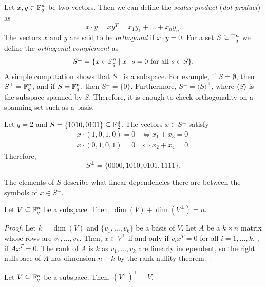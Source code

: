 \documentclass[../main.tex]{subfiles}
\begin{document}
Let $x, y \in \mathbb{F}_q^n$ be two vectors. Then we can define the \emph{scalar product} (\emph{dot product}) as
\begin{equation*}
    x \cdot y = xy^T = x_1y_1 + \dots + x_ny_n.
\end{equation*}
The vectors $x$ and $y$ are said to be \emph{orthogonal} if $x \cdot y = 0$. For a set $S \subseteq \mathbb{F}_q^n$ we define the \emph{orthogonal complement} as
\begin{equation*}
    S^\perp = \{x \in \mathbb{F}_q^n \mid x \cdot s = 0 \text{ for all $s \in S$}\}.
\end{equation*}
A simple computation shows that $S^\perp$ is a subspace. For example, if $S = \emptyset$, then $S^\perp = \mathbb{F}_q^n$, and if $S = \mathbb{F}_q^n$, then $S^\perp = \{0\}$. Furthermore, $S^\perp = \langle S \rangle^\perp$, where $\langle S \rangle$ is the subspace spanned by $S$. Therefore, it is enough to check orthogonality on a spanning set such as a basis.

\begin{example}
Let $q = 2$ and $S = \{ 1010, 0101 \} \subseteq \mathbb{F}_2^4$. The vectors $x \in S^\perp$ satisfy
\begin{align*}
    x \cdot (1, 0, 1, 0) = 0 &\iff x_1 + x_3 = 0 \\
    x \cdot (0, 1, 0, 1) = 0 &\iff x_2 + x_4 = 0.
\end{align*}
Therefore,
\begin{equation*}
    S^\perp = \{0000, 1010, 0101, 1111\}.
\end{equation*}
\end{example}

The elements of $S$ describe what linear dependencies there are between the symbols of $x \in S^\perp$.

\begin{theorem}\label{thm:dual_space_dimension}
Let $V \subseteq \mathbb{F}_q^n$ be a subspace. Then, $\dim(V) + \dim(V^\perp) = n$.
\end{theorem}

\begin{proof}
Let $k = \dim(V)$ and $\{v_1, \dots, v_k\}$ be a basis of $V$. Let $A$ be a $k \times n$ matrix whose rows are $v_1, \dots, v_k$. Then, $x \in V^\perp$ if and only if $v_i x^T = 0$ for all $i = 1, \dots, k$, \ie, if $Ax^T = 0$. The rank of $A$ is $k$ as $v_1, \dots, v_k$ are linearly independent, so the right nullspace of $A$ has dimension $n - k$ by the rank-nullity theorem.
\end{proof}

\begin{lemma}\label{lem:dual_properties}
Let $V \subseteq \mathbb{F}_q^n$ be a subspace. Then, $(V^\perp)^\perp = V$.
\end{lemma}
\end{document}
